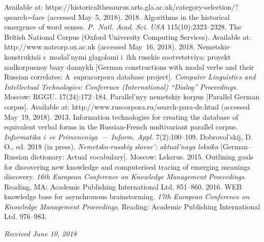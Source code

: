 \begin{multicols}{2}
{{\begin{thebibliography}{99}
Available at: {\sf https://historicalthesaurus.arts.gla.ac.uk/category-selection/?qsearch=face} 
(accessed May~5, 2018).
   2018. Algorithms in 
the historical emergence of word senses. \textit{P.~Natl. 
Acad. Sci. USA} 115(10):2323--2328.
  The British National Corpus (Oxford University Computing Services). Available at: {\sf 
http://www.natcorp.ox.ac.uk} (accessed May~16, 2018).
   2018. Nemetskie konstruktsii 
s~modal'nymi glagolami i~ikh russkie sootvetstviya: proyekt nadkorpusnoy bazy dannykh 
[German constructions with modal verbs and their Russian correlates: 
A~supracorpora database 
project]. \textit{Computer Linguistics and Intellectual Technologies: 
Conference (International) ``Dialog'' Proceedings}. Moscow: RGGU.  
17(24):172--184.
  Parallel'nyy nemetskiy korpus [Parallel German corpus]. Available at: {\sf 
http://www.ruscorpora.ru/search-para-de.html} (accessed May~19, 2018).
   2013. 
Information technologies for creating the database of equivalent verbal forms in the Russian-French 
multivariant parallel corpus. \textit{Informatika i~ee Primeneniya~--- Inform. Appl.} 
7(2):100--109.
  Dobrovol'skij, D.\,O., ed. 2018 (in press). \textit{Nemetsko-russkiy slovar': 
aktual'naya leksika }[German--Russian dictionary: Actual vocabulary]. Moscow: 
Leksrus.
   2015. Outlining goals for discovering new 
knowledge and computerised tracing of emerging meanings discovery. \textit{16th 
European Conference on Knowledge Management Proceedings}. Reading, MA: Academic 
Publishing International Ltd. 851--860.
   2016. 
WEB knowledge base for asynchronous brainstorming. \textit{17th European 
Conference on Knowledge Management Proceedings}. Reading: Academic 
Publishing International Ltd. 976--983.
    
 \end{thebibliography}

 }
 }

\end{multicols}

\vspace*{-6pt}

\hfill{\small\textit{Received June 10, 2018}}

